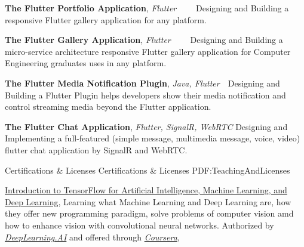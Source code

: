 \documentclass[letterpaper,MMMyyyy,nonstopmode]{resume}
\newcommand{\CVWebpage}{https://aliyazdi.tech}
\begin{document}
\begin{Body}
\BigGap
\BulletItem
\textbf{The Flutter Portfolio Application},
\textit{\small{Flutter}}
\hfill
{\normalsize{
\href{https://snapcraft.io/aliyazdi}
{\faLinux}
\,\SubBulletSymbol\,
\href{https://github.com/aliyazdi75/aliyazdi75.github.io/releases}
{\faAndroid}
\,\SubBulletSymbol\,
\href{\CVWebpage}
{\faGlobe}
\,\SubBulletSymbol\,
\href{https://github.com/aliyazdi75/aliyazdi75.github.io}
{\faGithub}
}}
\Item
Designing and Building a responsive Flutter gallery application for any platform.

\BigGap
\BulletItem
\textbf{The Flutter Gallery Application},
\textit{\small{Flutter}}
\hfill
{\normalsize{
\href{https://medium.com/flutter-community/the-software-engineering-approach-in-cross-platform-programming-with-flutter-part-1-efcdc8a8fc26?source=friends_link&sk=ceb60f56685ce66c7f9574595748f25b}
{\faMedium}
\,\SubBulletSymbol\,
\href{https://github.com/aliyazdi75/gallery/releases}
{\faAndroid}
\,\SubBulletSymbol\,
\href{\CVWebpage/gallery}
{\faGlobe}
\,\SubBulletSymbol\,
\href{https://github.com/aliyazdi75/gallery}
{\faGithub}
}}
\Item
Designing and Building a micro-service architecture responsive Flutter gallery application for Computer Engineering graduates uses in any platform.

\BigGap
\BulletItem
\textbf{The Flutter Media Notification Plugin},
\textit{\small{Java, Flutter}}
\hfill
{\normalsize{
\href{https://pub.dev/packages/flutter_media_notification}
{\faGlobe}
\,\SubBulletSymbol\,
\href{https://github.com/aliyazdi75/flutter_media_notification}
{\faGithub}
}}
\Item
Designing and Building a Flutter Plugin helps developers show their media notification and control streaming media beyond the Flutter application.

\BigGap
\BulletItem
\textbf{The Flutter Chat Application},
\textit{\small{Flutter, SignalR, WebRTC}}
\hfill
{\normalsize{
\href{https://github.com/aliyazdi75/flutter_chat}
{\faGithub}
}}
\Item
Designing and Implementing a full-featured (simple message, multimedia message, voice, video) flutter chat application by SignalR and WebRTC.


\Section
{Certifications \newline\&
Licenses}
{Certifications \& Licenses}
{PDF:TeachingAndLicenses}

\BulletItem
\href{https://coursera.org/share/81c743eeff5bf3e85dfc118ab47b9407}
{Introduction to TensorFlow for Artificial Intelligence, Machine Learning, and Deep Learning},
\Item
Learning what Machine Learning and Deep Learning are, how they offer new programming paradigm, solve problems of computer vision amd how to enhance vision with convolutional neural networks.
\newline
Authorized by
\href{https://www.deeplearning.ai}
{\textit{DeepLearning.AI}}
and offered through
\href{https://www.coursera.org/}
{\textit{Coursera}},



\end{Body}
\end{document}
